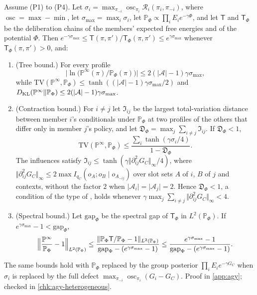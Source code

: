 \begin{theorem}\label{thm:agy-heterogeneous}
Assume (P1) to (P4). Let $\sigma_i=\max_{\pi_{-i}}\operatorname{osc}_{\pi_i}\mathcal R_i(\pi_i,\pi_{-i})$, where $\operatorname{osc}=\max-\min$, let $\sigma_{\max}=\max_i\sigma_i$, let $\mathbb P_\Phi\propto\prod_iE_ie^{-\gamma\Phi}$, and let $\mathsf T$ and $\mathsf T_\Phi$ be the deliberation chains of the members' expected free energies and of the potential $\Phi$. Then $e^{-\gamma\sigma_{\max}}\le\mathsf T(\pi,\pi')/\mathsf T_\Phi(\pi,\pi')\le e^{\gamma\sigma_{\max}}$ whenever $\mathsf T_\Phi(\pi,\pi')>0$, and:
\begin{enumerate}
\item[(a)] (Tree bound.) For every profile
\begin{equation*}
\bigl\lvert\ln\bigl(\mathbb P^\infty(\pi)/\mathbb P_\Phi(\pi)\bigr)\bigr\rvert\le2(\lvert\mathcal A\rvert-1)\gamma\sigma_{\max},
\end{equation*}
while $\mathrm{TV}(\mathbb P^\infty,\mathbb P_\Phi)\le\tanh((\lvert\mathcal A\rvert-1)\gamma\sigma_{\max}/2)$ and $D_{\mathrm{KL}}(\mathbb P^\infty\Vert\mathbb P_\Phi)\le2(\lvert\mathcal A\rvert-1)\gamma\sigma_{\max}$.
\item[(b)] (Contraction bound.) For $i\ne j$ let $\mathfrak I_{ij}$ be the largest total-variation distance between member $i$'s conditionals under $\mathbb P_\Phi$ at two profiles of the others that differ only in member $j$'s policy, and let $\mathfrak D_\Phi=\max_j\sum_{i\ne j}\mathfrak I_{ij}$. If $\mathfrak D_\Phi<1$,
\begin{equation}\label{eq:agy-contraction}
\mathrm{TV}(\mathbb P^\infty,\mathbb P_\Phi)\le\frac{\sum_i\tanh(\gamma\sigma_i/4)}{1-\mathfrak D_\Phi}.
\end{equation}
The influences satisfy $\mathfrak I_{ij}\le\tanh(\gamma\Vert\partial^2_{ij}G_C\Vert_\infty/4)$, where $\Vert\partial^2_{ij}G_C\Vert_\infty\le2\max I_{q_C}(o_A;o_B\mid o_{A_{-ij}})$ over slot sets $A$ of $i$, $B$ of $j$ and contexts, without the factor $2$ when $\lvert\mathcal A_i\rvert=\lvert\mathcal A_j\rvert=2$. Hence $\mathfrak D_\Phi<1$, a condition of the type of \citet{dobrushin1970prescribing}, holds whenever $\gamma\max_j\sum_{i\ne j}\Vert\partial^2_{ij}G_C\Vert_\infty<4$.
\item[(c)] (Spectral bound.) Let $\mathrm{gap}_\Phi$ be the spectral gap of $\mathsf T_\Phi$ in $L^2(\mathbb P_\Phi)$. If $e^{\gamma\sigma_{\max}}-1<\mathrm{gap}_\Phi$,
\begin{equation}\label{eq:agy-spectral}
\Bigl\Vert\frac{\mathbb P^\infty}{\mathbb P_\Phi}-1\Bigr\Vert_{L^2(\mathbb P_\Phi)}\le\frac{\Vert\mathbb P_\Phi\mathsf T/\mathbb P_\Phi-1\Vert_{L^2(\mathbb P_\Phi)}}{\mathrm{gap}_\Phi-(e^{\gamma\sigma_{\max}}-1)}\le\frac{e^{\gamma\sigma_{\max}}-1}{\mathrm{gap}_\Phi-(e^{\gamma\sigma_{\max}}-1)}.
\end{equation}
\end{enumerate}
The same bounds hold with $\mathbb P_\Phi$ replaced by the group posterior $\prod_iE_ie^{-\gamma G_C}$ when $\sigma_i$ is replaced by the full defect $\max_{\pi_{-i}}\operatorname{osc}_{\pi_i}(G_i-G_C)$. Proof in \cref{app:agy}; checked in \cref{chk:agy-heterogeneous}.
\end{theorem}
